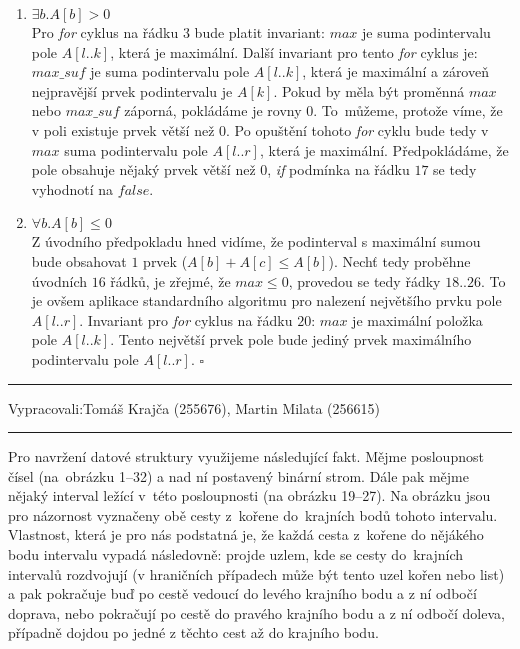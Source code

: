 \documentclass[12pt]{article}
\newcommand{\zadani}[2]{
{\large
\noindent {\bf IB108 \hfill{} Sada #1, Příklad #2 \\[-4mm]}
\noindent\hrule
\vspace{2mm}
\noindent Vypracovali:\hfill{}Tomáš Krajča (255676), Martin Milata (256615)
\vspace{3mm}
\hrule
\bigskip\bigskip}
}
\begin{document}
{
\renewcommand{\labelenumi}{$($\alph{enumi}$)$}
\begin{enumerate}

\item $\exists b.A[b] > 0$\\
Pro \textit{for} cyklus na řádku $3$ bude platit invariant: $max$ je 
suma podintervalu pole $A[l..k]$, která je maximální. Další invariant pro tento
\textit{for} cyklus je: $max\_suf$ je suma podintervalu pole $A[l..k]$, která je
maximální a zároveň nejpravější prvek podintervalu je $A[k]$. Pokud by měla být
proměnná $max$ nebo $max\_suf$ záporná, pokládáme je rovny $0$. To~můžeme,
protože víme, že v poli existuje prvek větší než $0$. Po opuštění tohoto
\textit{for} cyklu bude tedy v $max$ suma podintervalu pole $A[l..r]$, která je
maximální. Předpokládáme, že pole obsahuje nějaký prvek větší než $0$,
\textit{if} podmínka na řádku $17$ se tedy vyhodnotí na $false$.\\

\item $\forall b.A[b] \le 0$\\
Z úvodního předpokladu hned vidíme, že podinterval s maximální sumou bude
obsahovat $1$ prvek ($A[b] + A[c] \le A[b]$). Nechť tedy proběhne úvodních $16$
řádků, je zřejmé, že $max \le 0$, provedou se tedy řádky $18$..$26$. To je ovšem
aplikace standardního algoritmu pro nalezení největšího prvku pole $A[l..r]$.
Invariant pro \textit{for} cyklus na řádku $20$: $max$ je maximální položka
pole $A[l..k]$. Tento největší prvek pole bude jediný prvek maximálního
podintervalu pole $A[l..r]$.
\hfill$\square$

\end{enumerate}
}

\newpage
\zadani{1}{4}

Pro navržení datové struktury využijeme následující fakt. Mějme posloupnost
čísel (na~ob\-ráz\-ku 1--32) a nad ní postavený binární strom. Dále pak mějme nějaký
interval ležící v~této posloupnosti (na ob\-rá\-zku 19--27). Na obrázku jsou pro
názornost vyznačeny obě cesty z~kořene do~krajních bodů tohoto intervalu.
Vlastnost, která je pro nás podstatná je, že každá cesta z~kořene do nějákého
bodu intervalu vypadá následovně: projde uzlem, kde se cesty do~krajních
intervalů rozdvojují (v hraničních případech může být tento uzel kořen nebo
list) a pak pokračuje buď po cestě vedoucí do levého krajního bodu a z ní odbočí
doprava, nebo pokračují po cestě do pravého krajního bodu a z ní odbočí doleva,
případně dojdou po jedné z těchto cest až do krajního bodu.
\end{document}
